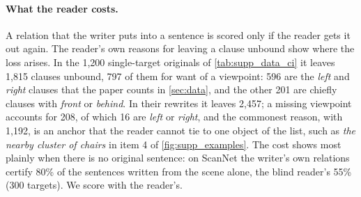 \paragraph{What the reader costs.}
A relation that the writer puts into a sentence is scored only if the reader gets it out again.
The reader's own reasons for leaving a clause unbound show where the loss arises.
In the 1,200 single-target originals of \cref{tab:supp_data_ci} it leaves 1,815 clauses unbound, 797 of them for want of a viewpoint: 596 are the \emph{left} and \emph{right} clauses that the paper counts in \cref{sec:data}, and the other 201 are chiefly clauses with \emph{front} or \emph{behind}.
In their rewrites it leaves 2,457; a missing viewpoint accounts for 208, of which 16 are \emph{left} or \emph{right}, and the commonest reason, with 1,192, is an anchor that the reader cannot tie to one object of the list, such as \emph{the nearby cluster of chairs} in item 4 of \cref{fig:supp_examples}.
The cost shows most plainly when there is no original sentence: on ScanNet the writer's own relations certify 80\% of the sentences written from the scene alone, the blind reader's 55\% (300 targets).
We score with the reader's.

